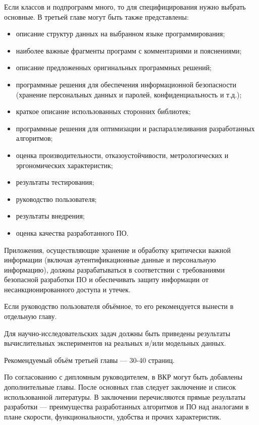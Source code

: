 \documentclass[14pt]{extarticle}
\begin{document}
Если классов и подпрограмм много, то для специфицирования нужно выбрать основные. 
В третьей главе могут быть также представлены:
\begin{itemize}[label=$\bullet$]
\item описание структур данных на выбранном языке программирования;
\item наиболее важные фрагменты программ с комментариями и пояснениями;
\item описание предложенных оригинальных программных решений;
\item программные решения для обеспечения информационной безопасности (хранение персональных данных и паролей, конфиденциальность и т.д.);
\item краткое описание использованных сторонних библиотек;
\item программные решения для оптимизации и распараллеливания разработанных алгоритмов;
\item оценка производительности, отказоустойчивости, метрологических и эргономических характеристик;
\item результаты тестирования;
\item руководство пользователя;
\item результаты внедрения;
\item оценка качества разработанного ПО.
\end{itemize}

Приложения, осуществляющие хранение и обработку критически важной информации (включая аутентификационные данные и персональную информацию), должны разрабатываться в соответствии с требованиями безопасной разработки ПО и обеспечивать защиту информации от несанкционированного доступа и утечек. 

Если руководство пользователя объёмное, то его рекомендуется вынести в отдельную главу.

Для научно-исследовательских задач должны быть приведены результаты вычислительных экспериментов на реальных и/или модельных данных.

Рекомендуемый объём третьей главы --- 30-40 страниц.

По согласованию с дипломным руководителем, в ВКР могут быть добавлены дополнительные главы. После основных глав следует заключение и список использованной литературы. В заключении перечисляются прямые результаты разработки --- преимущества разработанных алгоритмов и ПО над аналогами в плане скорости, функциональности, удобства и прочих характеристик.
\end{document}
